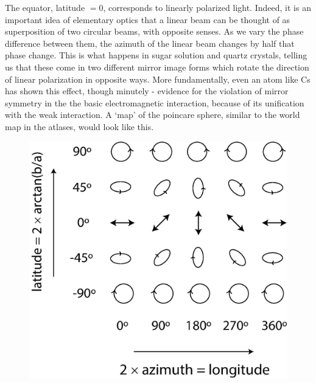 The equator, latitude $= 0$, corresponds to linearly polarized light. Indeed,
it is an important idea of elementary optics that a linear beam can be thought
of as superposition of two circular beams, with opposite senses. As we vary the
phase difference between them, the azimuth of the linear beam changes by half
that phase change. This is what happens in sugar solution and quartz crystals,
telling us that these come in two different mirror image forms which rotate the
direction of linear polarization in opposite ways. More fundamentally, even an
atom like Cs has shown this effect, though minutely - evidence for the violation
of mirror symmetry in the the basic electromagnetic interaction, because of its
unification with the weak interaction. A `map' of the poincare sphere, similar
to the world map in the atlases, would look like this.
\begin{figure}[H]
\centering
\includegraphics[scale=0.2]{src/images/chap26/6.jpg}
\end{figure}

